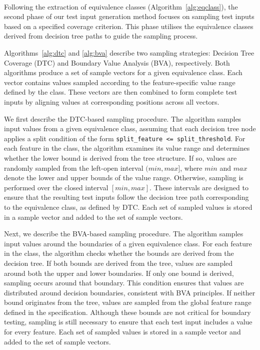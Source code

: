 \documentclass[
]{ceurart}
\theoremstyle{definition}
\begin{document}
\paragraph{}Following the extraction of equivalence classes (Algorithm~\ref{alg:eqclass}), the second phase of our test input generation method focuses on sampling test inputs based on a specified coverage criterion. This phase utilises the equivalence classes derived from decision tree paths to guide the sampling process.

Algorithms~\ref{alg:dtc} and \ref{alg:bva} describe two sampling strategies: Decision Tree Coverage (DTC) and Boundary Value Analysis (BVA), respectively. Both algorithms produce a set of sample vectors for a given equivalence class. Each vector contains values sampled according to the feature-specific value range defined by the class. These vectors are then combined to form complete test inputs by aligning values at corresponding positions across all vectors.

We first describe the DTC-based sampling procedure. The algorithm samples input values from a given equivalence class, assuming that each decision tree node applies a split condition of the form \lstinline{split_feature <= split_threshold}. For each feature in the class, the algorithm examines its value range and determines whether the lower bound is derived from the tree structure. If so, values are randomly sampled from the left-open interval $(min, max]$, where $min$ and $max$ denote the lower and upper bounds of the value range. Otherwise, sampling is performed over the closed interval $[min, max]$. These intervals are designed to ensure that the resulting test inputs follow the decision tree path corresponding to the equivalence class, as defined by DTC. Each set of sampled values is stored in a sample vector and added to the set of sample vectors.

Next, we describe the BVA-based sampling procedure. The algorithm samples input values around the boundaries of a given equivalence class. For each feature in the class, the algorithm checks whether the bounds are derived from the decision tree. If both bounds are derived from the tree, values are sampled around both the upper and lower boundaries. If only one bound is derived, sampling occurs around that boundary. This condition ensures that values are distributed around decision boundaries, consistent with BVA principles. If neither bound originates from the tree, values are sampled from the global feature range defined in the specification. Although these bounds are not critical for boundary testing, sampling is still necessary to ensure that each test input includes a value for every feature. Each set of sampled values is stored in a sample vector and added to the set of sample vectors.
\end{document}
